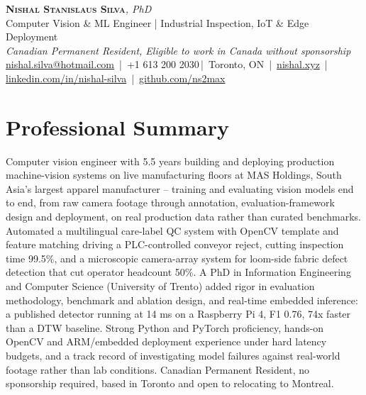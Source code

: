 \documentclass[11pt]{article}
\makeatletter
\newcommand{\cvName}{Nishal Stanislaus Silva}
\newcommand{\cvEmail}{nishal.silva@hotmail.com}
\newcommand{\cvPhone}{+1 613 200 2030}
\newcommand{\cvCity}{Toronto, ON}
\newcommand{\cvSite}{https://nishal.xyz}
\newcommand{\cvLinkedIn}{https://www.linkedin.com/in/nishal-silva}
\newcommand{\cvGitHub}{https://github.com/ns2max}
\newcommand{\cvStatus}{Canadian Permanent Resident, Eligible to work in Canada without sponsorship}
\newcommand{\cvTagline}{Computer Vision \& ML Engineer | Industrial Inspection, IoT \& Edge Deployment}
\makeatother
\begin{document}
\pagestyle{empty}
\begin{center}
    {\LARGE \scshape \textbf{\cvName}}{\large \textit{, PhD}}\\[1pt]
    {\small \cvTagline}\\[1pt]
    {\footnotesize\textit{\cvStatus}}\\[1pt]
    {\small
    \href{mailto:\cvEmail}{\cvEmail} \,|\, \cvPhone \,|\, \cvCity
    \,|\, \href{\cvSite}{nishal.xyz} \,|\, \href{\cvLinkedIn}{linkedin.com/in/nishal-silva}
    \,|\, \href{\cvGitHub}{github.com/ns2max}}
\end{center}

\section*{Professional Summary}
Computer vision engineer with 5.5 years building and deploying production machine-vision systems on live manufacturing floors at MAS Holdings, South Asia's largest apparel manufacturer -- training and evaluating vision models end to end, from raw camera footage through annotation, evaluation-framework design and deployment, on real production data rather than curated benchmarks. Automated a multilingual care-label QC system with OpenCV template and feature matching driving a PLC-controlled conveyor reject, cutting inspection time 99.5\%, and a microscopic camera-array system for loom-side fabric defect detection that cut operator headcount 50\%. A PhD in Information Engineering and Computer Science (University of Trento) added rigor in evaluation methodology, benchmark and ablation design, and real-time embedded inference: a published detector running at 14 ms on a Raspberry Pi 4, F1 0.76, 74x faster than a DTW baseline. Strong Python and PyTorch proficiency, hands-on OpenCV and ARM/embedded deployment experience under hard latency budgets, and a track record of investigating model failures against real-world footage rather than lab conditions. Canadian Permanent Resident, no sponsorship required, based in Toronto and open to relocating to Montreal.
\end{document}
